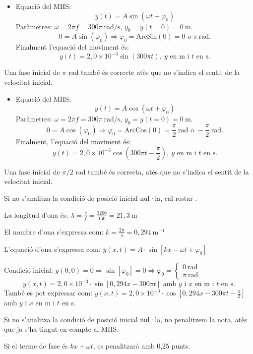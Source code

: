 \begin{solapartat}
\begin{itemize}[label={},leftmargin=2em]
\item {} Equació del MHS:
\[ y(t) = A\sin(\omega t + \varphi_0) \]
Paràmetres: $\omega = 2\pi f = 300\pi\ \mathrm{rad/s}$, $y_0 = y(t=0) = 0\ \mathrm{m}$.
\[ 0 = A\sin(\varphi_0) \Rightarrow \varphi_0 = \mathrm{ArcSin}(0) = 0 \text{ o } \pi\ \mathrm{rad}. \]
Finalment l'equació del moviment és:
\[ y(t) = 2,0\times 10^{-3}\sin(300\pi t),\ y \text{ en m i } t \text{ en s.} \]
\end{itemize}
Una fase inicial de $\pi$ rad també és correcte atès que no s'indica el sentit de la velocitat inicial.

\begin{itemize}[label={},leftmargin=2em]
\item {} Equació del MHS:
\[ y(t) = A\cos(\omega t + \varphi_0) \]
Paràmetres: $\omega = 2\pi f = 300\pi\ \mathrm{rad/s}$, $y_0 = y(t=0) = 0\ \mathrm{m}$.
\[ 0 = A\cos(\varphi_0) \Rightarrow \varphi_0 = \mathrm{ArcCos}(0) = \frac{\pi}{2}\ \mathrm{rad} \text{ o } -\frac{\pi}{2}\ \mathrm{rad}. \]
Finalment, l'equació del moviment és:
\[ y(t) = 2,0\times 10^{-3}\cos\left(300\pi t - \frac{\pi}{2}\right),\ y \text{ en m i } t \text{ en s.} \]
\end{itemize}
Una fase inicial de $\pi/2$ rad també és correcta, atès que no s'indica el sentit de la velocitat inicial.

Si no s'analitza la condició de posició inicial nul·la, cal restar .

\medskip
{} La longitud d'ona és: $\lambda = \frac{v}{f} = \frac{3200}{150} = 21,3\ \mathrm{m}$

 El nombre d'ona s'expressa com: $k = \frac{2\pi}{\lambda} = 0,294\ \mathrm{m^{-1}}$

L'equació d'ona s'expressa com: $y(x, t) = A\cdot\sin[kx - \omega t + \varphi_0]$

Condició inicial: $y(0, 0) = 0 \Longrightarrow \sin[\varphi_0] = 0 \Longrightarrow \varphi_0 = \begin{cases} 0\ \mathrm{rad}\\ \pi\ \mathrm{rad}\end{cases}$
\[ y(x, t) = 2,0\times 10^{-3}\cdot\sin[0,294x - 300\pi t] \text{ amb } y \text{ i } x \text{ en m i } t \text{ en s.} \]
També es pot expressar com: $y(x, t) = 2,0\times 10^{-3}\cdot\cos\left[0,294x - 300\pi t - \frac{\pi}{2}\right]$ amb $y$ i $x$ en m i $t$ en s.

Si no s'analitza la condició de posició inicial nul·la, no penalitzem la nota, atès que ja s'ha tingut en compte al MHS.

Si el terme de fase és $kx + \omega t$, es penalitzarà amb 0,25 punts.
\end{solapartat}

